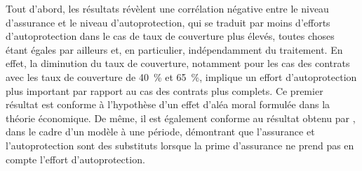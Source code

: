 \begin{Article}
\begin{refsection}[Mouminoux]
Tout d'abord, les résultats révèlent une corrélation négative entre le niveau d'assurance et le niveau d'autoprotection, qui se traduit par moins d'efforts d'autoprotection dans le cas de taux de couverture plus élevés, toutes choses étant égales par ailleurs et, en particulier, indépendamment du traitement. En effet, la diminution du taux de couverture, notamment pour les cas des contrats avec les taux de couverture de 40~\% et 65~\%, implique un effort d'autoprotection plus important par rapport au cas des contrats plus complets. Ce premier résultat est conforme à l'hypothèse d'un effet d'aléa moral formulée dans la théorie économique. De même, il est également conforme au résultat obtenu par \textcite{eb72}, dans le cadre d'un modèle à une période, démontrant que l'assurance et l'autoprotection sont des substituts lorsque la prime d'assurance ne prend pas en compte l'effort d'autoprotection.


\newpage


\end{refsection}
\end{Article}
